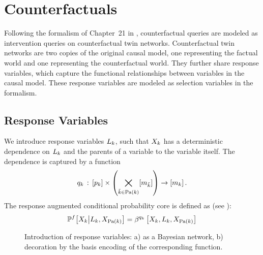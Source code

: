 \section{Counterfactuals}

Following the formalism of Chapter~21 in \cite{koller_probabilistic_2009}, counterfactual queries are modeled as intervention queries on counterfactual twin networks.
Counterfactual twin networks are two copies of the original causal model, one representing the factual world and one representing the counterfactual world.
They further share response variables, which capture the functional relationships between variables in the causal model.
These response variables are modeled as selection variables in the \tnreason{} formalism.



\subsection{Response Variables}

We introduce response variables $L_{k}$, such that $X_{k}$ has a deterministic dependence on $L_{k}$ and the parents of a variable to the variable itself.
The dependence is captured by a function
\begin{align*}
    q_{k} \,:\, [p_{k}] \times \left(\bigtimes_{\tilde{k}\in\mathrm{Pa}(k)}[m_{\tilde{k}}]\right) \rightarrow [m_{k}] \, .
\end{align*}
The response augmented conditional probability core is defined as (see ):
\begin{align*}
    \condprobwrtof{\responsesymbol}{\catvariableof{\atomenumerator}}{\selvariableof{\catenumerator},\catvariableof{\parentsof{\catenumerator}}}
    = \bencodingofat{\exfunctionof{\catenumerator}}{
        \catvariableof{\catenumerator},
        \selvariableof{\catenumerator},
        \catvariableof{\parentsof{\catenumerator}}
    }
\end{align*}

\begin{figure}[t]
    
    \caption{Introduction of response variables: a) as a Bayesian network, b) decoration by the basis encoding of the corresponding function.}
    \label{fig:responseVariable}
\end{figure}

